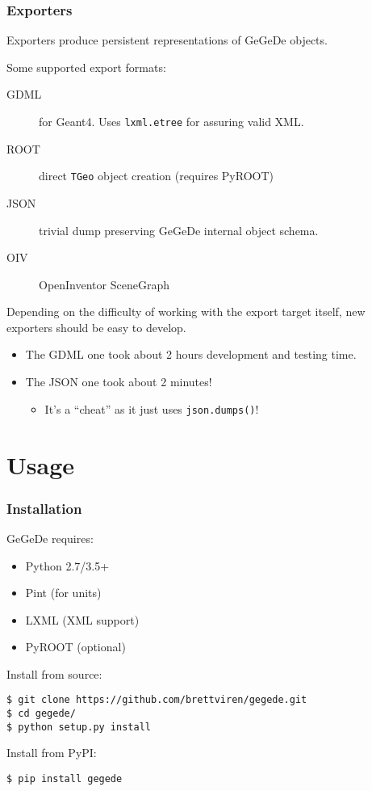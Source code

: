 \documentclass[10pt,xcolor=dvipsnames]{beamer}
\begin{document}
\begin{frame}
  \frametitle{Exporters}

  Exporters produce persistent representations of GeGeDe objects.

  \vspace{5mm}

  Some supported export formats:

  \begin{description}
  \item[GDML] for Geant4.  Uses \texttt{lxml.etree} for assuring valid XML.
  \item[ROOT] direct \texttt{TGeo} object creation (requires PyROOT)
  \item[JSON] trivial dump preserving GeGeDe internal object schema.
  \item[OIV] OpenInventor SceneGraph 
  \end{description}

  \vfill

  Depending on the difficulty of working with the export target
  itself, new exporters should be easy to develop.
  \begin{itemize}\footnotesize
  \item The GDML one took about 2 hours development and testing time. 
  \item The JSON one took about 2 minutes! 
    \begin{itemize}\tiny
    \item It's a ``cheat'' as it just uses \texttt{json.dumps()}!
    \end{itemize}
  \end{itemize}

\end{frame}

\section{Usage}
\begin{frame}
\end{frame}

\begin{frame}[fragile]
  \frametitle{Installation}
  GeGeDe requires:
  \begin{itemize}
  \item Python 2.7/3.5+
  \item Pint (for units)
  \item LXML (XML support)
  \item PyROOT (optional)
  \end{itemize}

  \vfill

  Install from source:
\begin{verbatim}
$ git clone https://github.com/brettviren/gegede.git
$ cd gegede/
$ python setup.py install
\end{verbatim}

  \vfill

  Install from PyPI:
\begin{verbatim}
$ pip install gegede
\end{verbatim}
\end{frame}
\end{document}
